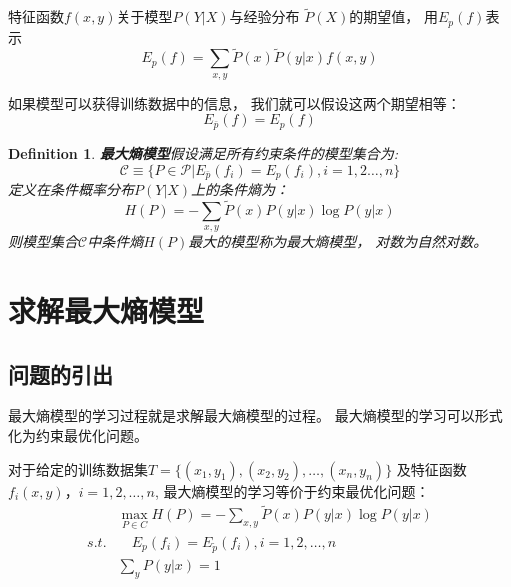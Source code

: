\documentclass[a4paper,12pt]{book}
\newtheorem{definition}{Definition}
\begin{document}
    特征函数$f(x,y)$关于模型$P(Y|X)$与经验分布 $\widetilde{P}(X)$的期望值， 
    用$E_{p}(f)$表示
    \begin{equation}
        E_{p}(f) =  \sum_{x, y} \widetilde{P}(x)\widetilde{P}(y|x) f(x,y)
    \end{equation}


    如果模型可以获得训练数据中的信息， 我们就可以假设这两个期望相等：
    \begin{equation}
        E_{\bar{p}}(f) = E_{p}(f)
    \end{equation}

    \begin{definition}
        \textbf{最大熵模型}假设满足所有约束条件的模型集合为:
        \begin{equation}
            \mathcal{C} \equiv \{P \in \mathcal{P} |E_{\bar{p}}(f_i) = E_{p}(f_i), i = 1, 2 \dots, n\}
        \end{equation}
        定义在条件概率分布$P(Y|X)$上的条件熵为：
        \begin{equation}
            H(P) = -\sum_{x, y} \widetilde{P}(x) P(y|x) \log P(y|x)
        \end{equation}
        则模型集合$\mathcal{C}$中条件熵$H(P)$最大的模型称为最大熵模型，
        对数为自然对数。
    \end{definition}

    \section{求解最大熵模型}
    \subsection{问题的引出}
    最大熵模型的学习过程就是求解最大熵模型的过程。
    最大熵模型的学习可以形式化为约束最优化问题。

    对于给定的训练数据集$T=\{(x_1,y_1),(x_2,y_2),\dots,(x_n,y_n)\}$
    及特征函数$f_i(x,y)， i=1, 2, \dots, n$,
    最大熵模型的学习等价于约束最优化问题：
    \begin{equation}
        \begin{split}
            &\max_{P \in C} H(P)=-\sum_{x,y} \widetilde{P}(x)P(y|x) \log P(y|x)\\
            s.t. &\quad E_p(f_i)=E_{\widetilde{p}}(f_i), i=1, 2, \dots, n \\
            &\sum_yP(y|x)=1
        \end{split}
    \end{equation}
\end{document}
